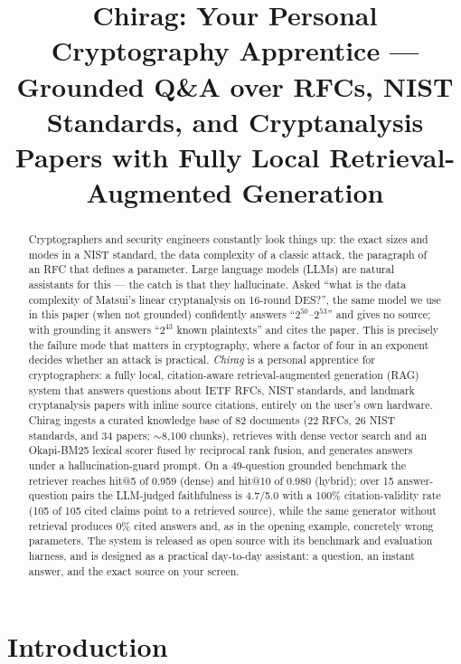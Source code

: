 \documentclass[version=submission]{iacrcc}
\title[running = {Chirag: Your Personal Cryptography Apprentice},
      subtitle = {A local, citation-aware Q\&A companion grounded in IETF RFCs, NIST standards, and the cryptanalysis literature}
     ]{Chirag: Your Personal Cryptography Apprentice --- Grounded Q\&A over RFCs, NIST Standards, and Cryptanalysis Papers with Fully Local Retrieval-Augmented Generation}
\begin{document}
\maketitle


\begin{abstract}
Cryptographers and security engineers constantly look things up: the exact
sizes and modes in a NIST standard, the data complexity of a classic attack,
the paragraph of an RFC that defines a parameter. Large language models
(LLMs) are natural assistants for this --- the catch is that they
hallucinate. Asked ``what is the data complexity of Matsui's linear
cryptanalysis on 16-round DES?'', the same model we use in this paper
(when not grounded) confidently answers ``$2^{50}$--$2^{53}$'' and gives no
source; with grounding it answers ``$2^{43}$ known plaintexts'' and cites
the paper. This is precisely the failure mode that matters in cryptography,
where a factor of four in an exponent decides whether an attack is practical.
\emph{Chirag} is a personal apprentice for cryptographers: a fully local,
citation-aware retrieval-augmented generation (RAG) system that answers
questions about IETF RFCs, NIST standards, and landmark cryptanalysis papers
with inline source citations, entirely on the user's own hardware.
Chirag ingests a curated knowledge base of 82 documents (22 RFCs, 26 NIST
standards, and 34 papers; $\sim$8{,}100 chunks), retrieves with dense
vector search and an Okapi-BM25 lexical scorer fused by reciprocal rank
fusion, and generates answers under a hallucination-guard prompt. On a
49-question grounded benchmark the retriever reaches hit@5 of 0.959
(dense) and hit@10 of 0.980 (hybrid); over 15 answer-question pairs the
LLM-judged faithfulness is 4.7/5.0 with a 100\% citation-validity rate
(105 of 105 cited claims point to a retrieved source), while the same
generator without retrieval produces 0\% cited answers and, as in the
opening example, concretely wrong parameters. The system is released as
open source with its benchmark and evaluation harness, and is designed as
a practical day-to-day assistant: a question, an instant answer, and the
exact source on your screen.
\end{abstract}

\section{Introduction}
\end{document}
